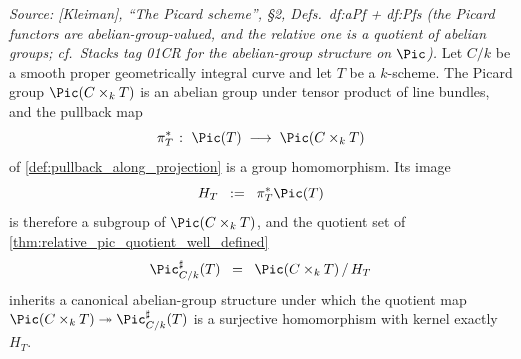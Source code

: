 \begin{lemma}
  \label{lem:rel_pic_sharp_groupoid}

  \textit{Source: [Kleiman], ``The Picard scheme'', \S 2,
  Defs.~df:aPf + df:Pfs (the Picard functors are abelian-group-valued, and the
  relative one is a quotient of abelian groups; cf.\ Stacks tag 01CR for the
  abelian-group structure on \(\Pic\)).}
  Let \(C/k\) be a smooth proper geometrically integral curve and let \(T\) be a
  \(k\)-scheme. The Picard group \(\Pic(C \times_k T)\) is an abelian group under
  tensor product of line bundles, and the pullback map
  \[
    \pi_T^* \;\colon\; \Pic(T) \;\longrightarrow\; \Pic(C \times_k T)
  \]
  of \cref{def:pullback_along_projection} is a group homomorphism. Its image
  \[
    H_T \;\;:=\;\; \pi_T^* \Pic(T)
  \]
  is therefore a subgroup of \(\Pic(C \times_k T)\), and the quotient set of
  \cref{thm:relative_pic_quotient_well_defined}
  \[
    \Pic^\sharp_{C/k}(T) \;\;=\;\; \Pic(C \times_k T) \, / \, H_T
  \]
  inherits a canonical abelian-group structure under which the quotient map
  \(\Pic(C \times_k T) \twoheadrightarrow \Pic^\sharp_{C/k}(T)\) is a surjective
  homomorphism with kernel exactly \(H_T\).
\end{lemma}

